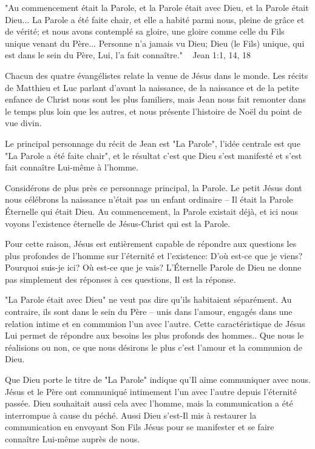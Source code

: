 

"Au commencement était la Parole, et la Parole était avec Dieu, et la Parole était Dieu... La Parole a été faite chair, et elle a habité parmi nous, pleine de grâce et de vérité; et nous avons contemplé sa gloire, une gloire comme celle du Fils unique venant du Père... Personne n'a jamais vu Dieu; Dieu (le Fils) unique, qui est dans le sein du Père, Lui, l'a fait connaître." ~ Jean 1:1, 14, 18

Chacun des quatre évangélistes relate la venue de Jésus dans le monde. Les récits de Matthieu et Luc parlant d'avant la naissance, de la naissance et de la petite enfance de Christ nous sont les plus familiers, mais Jean nous fait remonter dans le temps plus loin que les autres, et nous présente l'histoire de Noël du point de vue divin.

Le principal personnage du récit de Jean est "La Parole", l'idée centrale est que "La Parole a été faite chair", et le résultat c'est que Dieu s'est manifesté et s'est fait connaître Lui-même à l'homme.

Considérons de plus près ce personnage principal, la Parole. Le petit Jésus dont nous célébrons la naissance n'était pas un enfant ordinaire – Il était la Parole Éternelle qui était Dieu. Au commencement, la Parole existait déjà, et ici nous voyons l'existence éternelle de Jésus-Christ qui est la Parole.

Pour cette raison, Jésus est entièrement capable de répondre aux questions les plus profondes de l'homme sur l'éternité et l'existence: D'où est-ce que je viens? Pourquoi suis-je ici? Où est-ce que je vais? L'Éternelle Parole de Dieu ne donne pas simplement des réponses à ces questions, Il est la réponse.

"La Parole était avec Dieu" ne veut pas dire qu'ils habitaient séparément. Au contraire, ils sont dans le sein du Père – unis dans l'amour, engagés dans une relation intime et en communion l'un avec l'autre. Cette caractéristique de Jésus Lui permet de répondre aux besoins les plus profonds des hommes.. Que nous le réalisions ou non, ce que nous désirons le plus c'est l'amour et la communion de Dieu.

Que Dieu porte le titre de "La Parole" indique qu'Il aime communiquer avec nous. Jésus et le Père ont communiqué intimement l'un avec l'autre depuis l'éternité passée. Dieu souhaitait aussi cela avec l'homme, mais la communication a été interrompue à cause du péché. Aussi Dieu s'est-Il mis à restaurer la communication en envoyant Son Fils Jésus pour se manifester et se faire connaître Lui-même auprès de nous.

